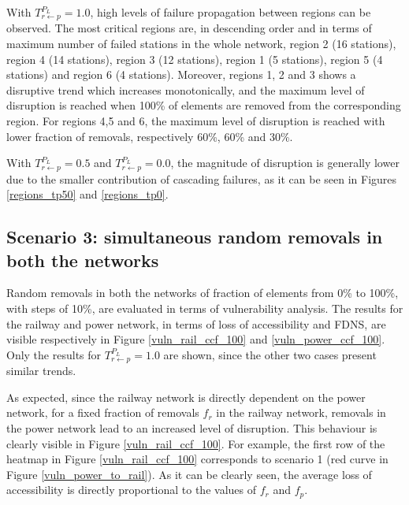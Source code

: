 \documentclass[review]{elsarticle}
\begin{document}
With $T_{r \leftarrow p}^{P_L}=1.0$, high levels of failure propagation between regions can be observed. The most critical regions are, in descending order and in terms of maximum number of failed stations in the whole network, region 2 (16 stations), region 4 (14 stations), region 3 (12 stations), region 1 (5 stations), region 5 (4 stations) and region 6 (4 stations). Moreover, regions 1, 2 and 3 shows a disruptive trend which increases monotonically, and the maximum level of disruption is reached when 100\% of elements are removed from the corresponding region. For regions 4,5 and 6, the maximum level of disruption is reached with lower fraction of removals, respectively 60\%, 60\% and 30\%.

With $T_{r \leftarrow p}^{P_L}=0.5$ and $T_{r \leftarrow p}^{P_L}=0.0$, the magnitude of disruption is generally lower due to the smaller contribution of cascading failures, as it can be seen in Figures \ref{regions_tp50} and \ref{regions_tp0}.




	
\subsection{Scenario 3: simultaneous random removals in both the networks}
Random removals in both the networks of fraction of elements from 0\% to 100\%, with steps of 10\%, are evaluated in terms of vulnerability analysis. The results for the railway and power network, in terms of loss of accessibility and FDNS, are visible respectively in Figure \ref{vuln_rail_ccf_100} and \ref{vuln_power_ccf_100}. Only the results for $T_{r \leftarrow p}^{P_L}=1.0$ are shown, since the other two cases present similar trends.

As expected, since the railway network is directly dependent on the power network, for a fixed fraction of removals $f_r$ in the railway network, removals in the power network lead to an increased level of disruption. This behaviour is clearly visible in Figure \ref{vuln_rail_ccf_100}. For example, the first row of the heatmap in Figure \ref{vuln_rail_ccf_100} corresponds to scenario 1 (red curve in Figure \ref{vuln_power_to_rail}). As it can be clearly seen, the average loss of accessibility is directly proportional to the values of $f_r$ and $f_p$.
\end{document}
